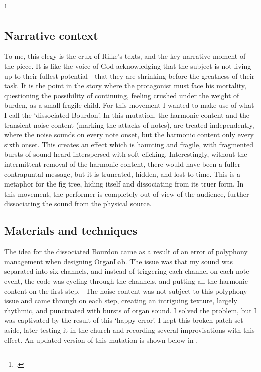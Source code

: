 \documentclass[12pt,twoside,maitrise]{dms_ks}
\theoremstyle{definition}
\begin{document}
{\footcitetext[57]{rilke_egies_1986}

\subsection{Narrative context}

To me, this elegy is the crux of Rilke's texts, and the key narrative moment of the piece.
It is like the voice of God acknowledging that the subject is not living up to their fullest potential---that they are shrinking before the greatness of their task.
It is the point in the story where the protagonist must face his mortality, questioning the possibility of continuing, feeling crushed under the weight of burden, as a small fragile child.
For this movement I wanted to make use of what I call the `dissociated Bourdon'.
In this mutation, the harmonic content and the transient noise content (marking the attacks of notes), are treated independently, where the noise sounds on every note onset, but the harmonic content only every sixth onset.
This creates an effect which is haunting and fragile, with fragmented bursts of sound heard interspersed with soft clicking.
Interestingly, without the intermittent removal of the harmonic content, there would have been a fuller contrapuntal message, but it is truncated, hidden, and lost to time.
This is a metaphor for the fig tree, hiding itself and dissociating from its truer form.
In this movement, the performer is completely out of view of the audience, further dissociating the sound from the physical source.

\subsection{Materials and techniques}

The idea for the dissociated Bourdon came as a result of an error of polyphony management when designing OrganLab.
The issue was that my sound was separated into six channels, and instead of triggering each channel on each note event, the code was cycling through the channels, and putting all the harmonic content on the first step.~
The noise content was not subject to this polyphony issue and came through on each step, creating an intriguing texture, largely rhythmic, and punctuated with bursts of organ sound.
I solved the problem, but I was captivated by the result of this `happy error'.
I kept this broken patch set aside, later testing it in the church and recording several improvisations with this effect.
An updated version of this mutation is shown below in .

}
\end{document}
